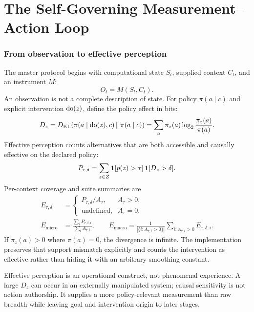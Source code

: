 \clearpage
\part{The Self-Governing Measurement--Action Loop}

\section{From observation to effective perception}
The master protocol begins with computational state $S_t$, supplied context $C_t$, and an instrument $M$:
\begin{equation}
O_t=M(S_t,C_t).
\label{eq:observation}
\end{equation}
An observation is not a complete description of state. For policy $\pi(a\mid c)$ and explicit intervention $\operatorname{do}(z)$, define the policy effect in bits:
\begin{equation}
D_z=D_{\mathrm{KL}}\!\left(\pi(a\mid\operatorname{do}(z),c)\,\middle\|\,\pi(a\mid c)\right)
=\sum_a\pi_z(a)\log_2\frac{\pi_z(a)}{\pi(a)}.
\label{eq:policy-effect}
\end{equation}
Effective perception counts alternatives that are both accessible and causally effective on the declared policy:
\begin{equation}
P_{\tau,\delta}=\sum_{z\in Z}\mathbf 1[p(z)>\tau]\,\mathbf 1[D_z>\delta].
\label{eq:effective-perception}
\end{equation}
Per-context coverage and suite summaries are
\begin{align}
E_{\tau,\delta}&=
\begin{cases}
P_{\tau,\delta}/A_\tau,&A_\tau>0,\\
\text{undefined},&A_\tau=0,
\end{cases}\\
E_{\mathrm{micro}}&=\frac{\sum_iP_{\tau,\delta,i}}{\sum_iA_{\tau,i}},
\qquad
E_{\mathrm{macro}}=\frac{1}{|\{i:A_{\tau,i}>0\}|}
\sum_{i:A_{\tau,i}>0}E_{\tau,\delta,i}.
\end{align}
If $\pi_z(a)>0$ where $\pi(a)=0$, the divergence is infinite. The implementation preserves that support mismatch explicitly and counts the intervention as effective rather than hiding it with an arbitrary smoothing constant.

Effective perception is an operational construct, not phenomenal experience. A large $D_z$ can occur in an externally manipulated system; causal sensitivity is not action authorship. It supplies a more policy-relevant measurement than raw breadth while leaving goal and intervention origin to later stages.

